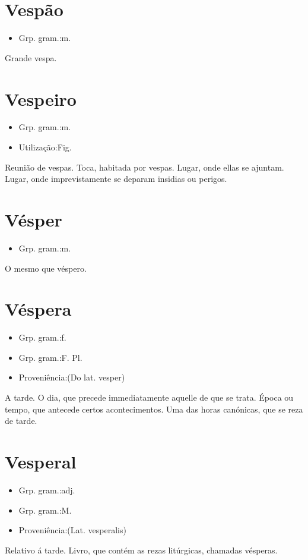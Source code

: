 \documentclass{article}
\begin{document}
\section{Vespão}
\begin{itemize}
\item {Grp. gram.:m.}
\end{itemize}
Grande vespa.
\section{Vespeiro}
\begin{itemize}
\item {Grp. gram.:m.}
\end{itemize}
\begin{itemize}
\item {Utilização:Fig.}
\end{itemize}
Reunião de vespas.
Toca, habitada por vespas.
Lugar, onde ellas se ajuntam.
Lugar, onde imprevistamente se deparam insidias ou perigos.
\section{Vésper}
\begin{itemize}
\item {Grp. gram.:m.}
\end{itemize}
O mesmo que \textunderscore véspero\textunderscore .
\section{Véspera}
\begin{itemize}
\item {Grp. gram.:f.}
\end{itemize}
\begin{itemize}
\item {Grp. gram.:F. Pl.}
\end{itemize}
\begin{itemize}
\item {Proveniência:(Do lat. \textunderscore vesper\textunderscore )}
\end{itemize}
A tarde.
O dia, que precede immediatamente aquelle de que se trata.
Época ou tempo, que antecede certos acontecimentos.
Uma das horas canónicas, que se reza de tarde.
\section{Vesperal}
\begin{itemize}
\item {Grp. gram.:adj.}
\end{itemize}
\begin{itemize}
\item {Grp. gram.:M.}
\end{itemize}
\begin{itemize}
\item {Proveniência:(Lat. \textunderscore vesperalis\textunderscore )}
\end{itemize}
Relativo á tarde.
Livro, que contém as rezas litúrgicas, chamadas vésperas.
\end{document}
